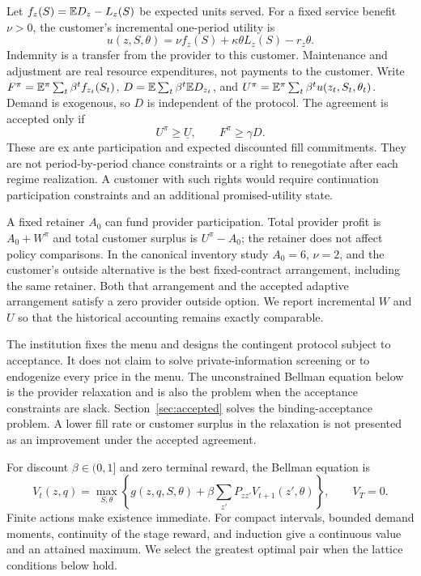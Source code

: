 Let $f_z(S)=\mathbb E D_z-L_z(S)$ be expected units served. For a fixed service benefit $\nu>0$, the customer's incremental one-period utility is
\begin{equation}\label{eq:customer}
 u(z,S,\theta)=\nu f_z(S)+\kappa\theta L_z(S)-r_z\theta.
\end{equation}
Indemnity is a transfer from the provider to this customer. Maintenance and adjustment are real resource expenditures, not payments to the customer. Write $F^\pi=\mathbb E^\pi\sum_t\beta^t f_{z_t}(S_t)$, $D=\mathbb E\sum_t\beta^t\mathbb E D_{z_t}$, and $U^\pi=\mathbb E^\pi\sum_t\beta^t u(z_t,S_t,\theta_t)$. Demand is exogenous, so $D$ is independent of the protocol. The agreement is accepted only if
\begin{equation}\label{eq:participation}
 U^\pi\geq\underline U,\qquad F^\pi\geq\gamma D.
\end{equation}
These are ex ante participation and expected discounted fill commitments. They are not period-by-period chance constraints or a right to renegotiate after each regime realization. A customer with such rights would require continuation participation constraints and an additional promised-utility state.

A fixed retainer $A_0$ can fund provider participation. Total provider profit is $A_0+W^\pi$ and total customer surplus is $U^\pi-A_0$; the retainer does not affect policy comparisons. In the canonical inventory study $A_0=6$, $\nu=2$, and the customer's outside alternative is the best fixed-contract arrangement, including the same retainer. Both that arrangement and the accepted adaptive arrangement satisfy a zero provider outside option. We report incremental $W$ and $U$ so that the historical accounting remains exactly comparable.

The institution fixes the menu and designs the contingent protocol subject to acceptance. It does not claim to solve private-information screening or to endogenize every price in the menu. The unconstrained Bellman equation below is the provider relaxation and is also the problem when the acceptance constraints are slack. Section~\ref{sec:accepted} solves the binding-acceptance problem. A lower fill rate or customer surplus in the relaxation is not presented as an improvement under the accepted agreement.

For discount $\beta\in(0,1]$ and zero terminal reward, the Bellman equation is
\begin{equation}\label{eq:bellman}
 V_t(z,q)=\max_{S,\theta}\left\{g(z,q,S,\theta)
       +\beta\sum_{z'}P_{zz'}V_{t+1}(z',\theta)\right\},\qquad V_T=0.
\end{equation}
Finite actions make existence immediate. For compact intervals, bounded demand moments, continuity of the stage reward, and induction give a continuous value and an attained maximum. We select the greatest optimal pair when the lattice conditions below hold.


